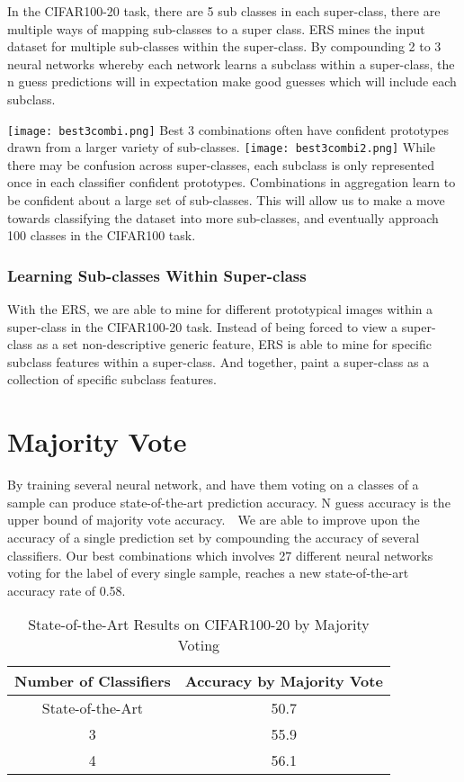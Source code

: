 \documentclass[10pt,twocolumn,letterpaper]{article}
\begin{document}
In the CIFAR100-20 task, there are 5 sub classes in each super-class, there are multiple ways of mapping sub-classes to a super class. ERS mines the input dataset for multiple sub-classes within the super-class. By compounding  2 to 3 neural networks whereby each network learns a subclass within a super-class, the n guess predictions will in expectation make good guesses which will include each subclass. 

\texttt{[image: best3combi.png]}
Best 3 combinations often have confident prototypes drawn from a larger variety of sub-classes. 
\texttt{[image: best3combi2.png]}
While there may be confusion across super-classes, each subclass is only represented once in each classifier confident prototypes. Combinations in aggregation learn to be confident about a large set of sub-classes. This will allow us to make a move towards classifying the dataset into more sub-classes, and eventually approach 100 classes in the CIFAR100 task. 

\subsubsection{Learning Sub-classes Within Super-class}
With the ERS, we are able to mine for different prototypical images within a super-class in the CIFAR100-20 task. Instead of being forced to view a super-class as a set non-descriptive generic feature, ERS is able to mine for specific subclass features within a super-class. And together, paint a super-class as a collection of specific subclass features. 

\section{Majority Vote}
By training several neural network, and have them voting on a classes of a sample can produce state-of-the-art prediction accuracy. N guess accuracy is the upper bound of majority vote accuracy.　We are able to improve upon the accuracy of a single prediction set by compounding the accuracy of several classifiers.  Our best combinations which involves 27 different neural networks voting for the label of every single sample, reaches a new state-of-the-art accuracy rate of 0.58. 

\begin{table}[h]
\caption{State-of-the-Art Results on CIFAR100-20 by Majority Voting}
\begin{center}
\begin{tabular}{c|c}
    \hline
       Number of Classifiers & Accuracy by Majority Vote  \\  \hline
       State-of-the-Art & 50.7 \\ 
       3 & 55.9 \\
       4 & 56.1 \\

\end{tabular}
\end{center}
\label{tab:multicol}
\end{table}
\end{document}
